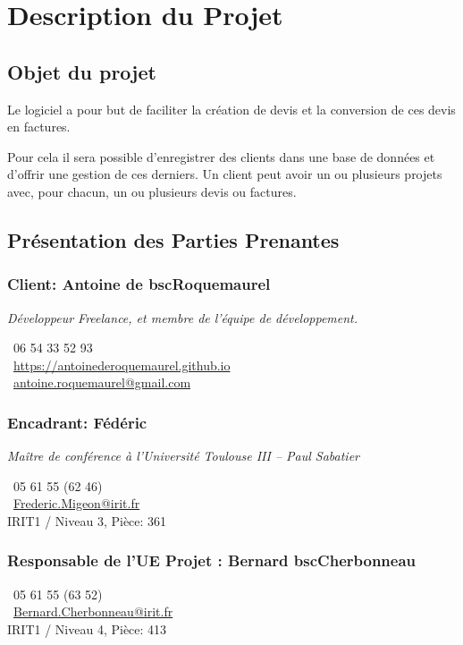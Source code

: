 \chapter{Description du Projet}
\section{Objet du projet}
Le logiciel a pour but de faciliter la création de devis et la conversion de ces devis en factures. 

Pour cela il sera possible d’enregistrer des
clients dans une base de données et d’offrir une gestion de ces derniers. Un client peut avoir un ou plusieurs projets avec, pour chacun, un ou
plusieurs devis ou factures.

\section{Présentation des Parties Prenantes}
	\subsection{Client: Antoine de bsc{Roquemaurel}}
	\textit{Développeur Freelance, et membre de l'équipe de développement. }

		\Telefon~06 54 33 52 93\\
		\Mundus~\url{https://antoinederoquemaurel.github.io}\\
		\Letter~\href{mailto:antoine.roquemaurel@gmail.com}{antoine.roquemaurel@gmail.com} \\		
	\subsection{Encadrant: Fédéric }
	\textit{Maître de conférence à l'Université Toulouse III -- Paul Sabatier}

		\Telefon~05 61 55 (62 46) \\
		\Letter~\href{mailto:Frederic.Migeon@irit.fr}{Frederic.Migeon@irit.fr} \\
		IRIT1 / Niveau 3, Pièce: 361 \\

		\subsection{Responsable de l'UE Projet : Bernard bsc{Cherbonneau}}
		\Telefon~05 61 55 (63 52)\\
		\Letter~\href{mailto:Bernard.Cherbonneau@irit.fr}{Bernard.Cherbonneau@irit.fr}\\
		IRIT1 / Niveau 4, Pièce: 413

